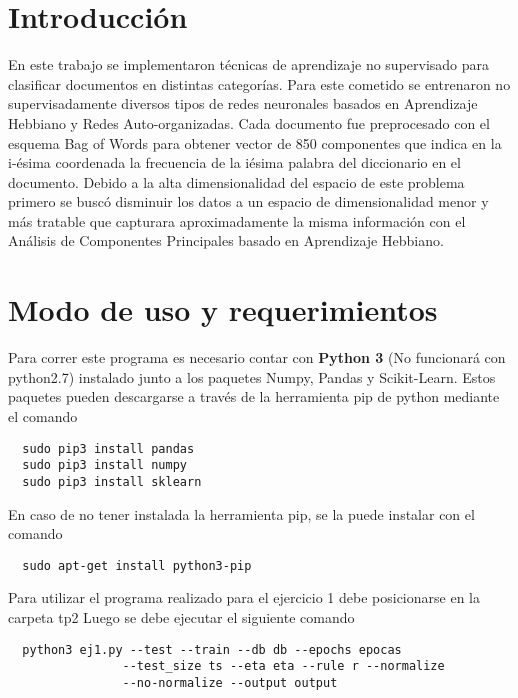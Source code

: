 \section{Introducción}

En este trabajo se implementaron técnicas de aprendizaje no supervisado para
clasificar documentos en distintas categorías. Para este cometido se entrenaron
no supervisadamente diversos tipos de redes neuronales basados en Aprendizaje
Hebbiano y Redes Auto-organizadas. Cada documento fue preprocesado con el
esquema Bag of Words para obtener vector de 850 componentes que indica en la i-ésima
coordenada la frecuencia de la iésima palabra del diccionario en el documento.
Debido a la alta dimensionalidad del espacio de este problema primero se buscó
disminuir los datos a un espacio de dimensionalidad menor y más tratable que
capturara aproximadamente la misma información con el Análisis de Componentes
Principales basado en Aprendizaje Hebbiano.


\section{Modo de uso y requerimientos}
Para correr este programa es necesario contar con \textbf{Python 3} (No funcionará con python2.7) instalado junto a los paquetes Numpy, Pandas y Scikit-Learn. Estos paquetes pueden descargarse a través
de la herramienta pip de python mediante el comando
\begin{verbatim}
  sudo pip3 install pandas
  sudo pip3 install numpy
  sudo pip3 install sklearn
\end{verbatim}
En caso de no tener instalada la herramienta pip, se la puede instalar con el comando
\begin{verbatim}
  sudo apt-get install python3-pip
\end{verbatim}

Para utilizar el programa realizado para el ejercicio 1 debe posicionarse en la carpeta tp2 Luego se debe ejecutar el siguiente comando
\begin{verbatim}
  python3 ej1.py --test --train --db db --epochs epocas
                --test_size ts --eta eta --rule r --normalize
                --no-normalize --output output
\end{verbatim}


